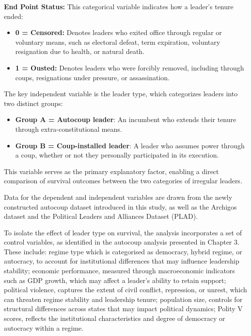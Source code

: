 \documentclass[
  12pt,
]{report}
\providecommand{\tightlist}{%
  \setlength{\itemsep}{0pt}\setlength{\parskip}{0pt}}
\begin{document}
\textbf{End Point Status:} This categorical variable indicates how a
leader's tenure ended:

\begin{itemize}
\item
  \textbf{0 = Censored:} Denotes leaders who exited office through
  regular or voluntary means, such as electoral defeat, term expiration,
  voluntary resignation due to health, or natural death.
\item
  \textbf{1 = Ousted:} Denotes leaders who were forcibly removed,
  including through coups, resignations under pressure, or
  assassination.
\end{itemize}

The key independent variable is the leader type, which categorizes
leaders into two distinct groups:

\begin{itemize}
\tightlist
\item
  \textbf{Group A = Autocoup leader}: An incumbent who extends their
  tenure through extra-constitutional means.
\item
  \textbf{Group B = Coup-installed leader}: A leader who assumes power
  through a coup, whether or not they personally participated in its
  execution.
\end{itemize}

This variable serves as the primary explanatory factor, enabling a
direct comparison of survival outcomes between the two categories of
irregular leaders.

Data for the dependent and independent variables are drawn from the
newly constructed autocoup dataset introduced in this study, as well as
the Archigos dataset and the Political Leaders and Alliances Dataset
(PLAD).

To isolate the effect of leader type on survival, the analysis
incorporates a set of control variables, as identified in the autocoup
analysis presented in Chapter 3. These include: regime type which is
categorised as democracy, hybrid regime, or autocracy, to account for
institutional differences that may influence leadership stability;
economic performance, measured through macroeconomic indicators such as
GDP growth, which may affect a leader's ability to retain support;
political violence, captures the extent of civil conflict, repression,
or unrest, which can threaten regime stability and leadership tenure;
population size, controls for structural differences across states that
may impact political dynamics; Polity V scores, reflects the
institutional characteristics and degree of democracy or autocracy
within a regime.
\end{document}
